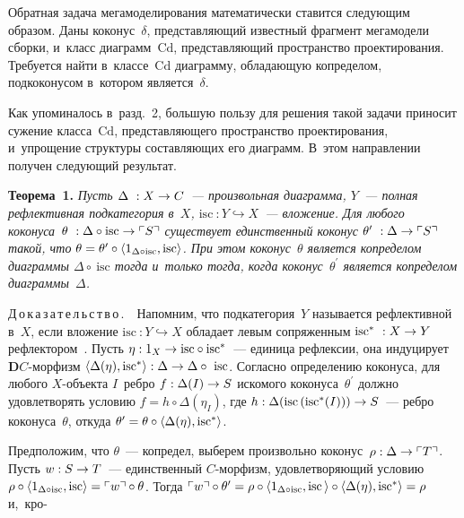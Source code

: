 \begin{multicols}{2}
Обратная задача мегамоделирования ма\-те\-ма\-тически 
ставится следующим образом. Даны коконус~$\delta$, пред\-став\-ля\-ющий 
известный фрагмент\linebreak
 мегамодели сборки, и~класс диаграмм~$\mathrm{Cd}$, 
представляющий пространство проектирования. Требуется найти 
в~классе~$\mathrm{Cd}$ диаграмму, обладающую копределом, подкоконусом в~котором 
является~$\delta$.
   
   Как упоминалось в~разд.~2, большую пользу для решения такой задачи 
приносит сужение класса~$\mathrm{Cd}$, представляющего пространство 
проектирования, и~упрощение структуры составляющих его диаграмм. В~этом 
направлении получен следующий результат.
   
   \smallskip
   
   \noindent
   \textbf{Теорема~1.} \textit{Пусть $\Delta~: X\hm\to C$~--- произвольная 
диаграмма, $Y$~--- полная рефлективная подкатегория в~$X$, $\mathrm{isc}~: 
Y\hookrightarrow X$~--- вложение. Для любого коконуса~$\theta~: \Delta \circ 
\mathrm{isc} \hm\to \ulcorner S\urcorner$ существует единственный коконус 
$\theta^\prime~: \Delta\hm\to \ulcorner S\urcorner$ такой, что 
$\theta\hm=\theta^\prime \circ \langle 1_{\Delta \circ \mathrm{isc}}, \mathrm{isc}\rangle$. При этом 
коконус~$\theta$ является копределом диаграммы $\Delta \circ~\mathrm{isc}$ тогда 
и~только тогда, когда коконус~$\theta^\prime$ является копределом 
диаграммы~$\Delta$.}
   
   \smallskip
   
   \noindent
   Д\,о\,к\,а\,з\,а\,т\,е\,л\,ь\,с\,т\,в\,о\,.\ \ Напомним, что подкатегория~$Y$ 
называется рефлективной в~$X$, если вложение $\mathrm{isc}~: Y\hookrightarrow X$ 
обладает левым сопряженным $\mathrm{isc}^*~: X\hm\to Y$ 
рефлектором~\cite[разд.~4.3]{16-kov}. Пусть $\eta : 1_X \hm\to \mathrm{isc} \circ  
\mathrm{isc}^*$~--- единица рефлексии, она индуцирует $\mathbf{D}C$-мор\-физм 
$\langle\Delta (\eta), \mathrm{isc}^*\rangle : \Delta\hm\to \Delta \circ~\mathrm{isc}$. Согласно 
определению коконуса, для любого \mbox{$X$-объ}\-ек\-та $I$~ребро $f : \Delta 
(I)\hm\to S$ искомого коконуса~$\theta^\prime$ должно удовлетворять условию 
$f = h \circ \Delta (\eta_I)$, где $h : \Delta (\mathrm{isc}\,(\mathrm{isc}^*(I))) \hm\to S$~--- ребро 
коконуса~$\theta$, откуда $\theta^\prime\hm = \theta \circ \langle \Delta (\eta), 
\mathrm{isc}^*\rangle$.
   
   Предположим, что $\theta$~--- копредел, выберем произвольно 
коконус~$\rho : \Delta\hm \to \ulcorner T\urcorner$. Пусть $w : S \hm\to T$~--- 
единственный $C$-мор\-физм, удовлетворяющий условию $\rho \circ \langle 1_{\Delta 
\circ  \mathrm{isc}}, 
\mathrm{isc}\rangle\hm = \ulcorner w\urcorner \circ \theta$. Тогда $\ulcorner 
w\urcorner \circ \theta^\prime \hm= \rho\circ \langle 1_{\Delta\circ \mathrm{isc}}, 
\mathrm{isc}\,\rangle 
\circ \langle \Delta (\eta), \mathrm{isc}^*\rangle \hm= \rho$ и,~кро-\linebreak\vspace*{-12pt}


\end{multicols}

